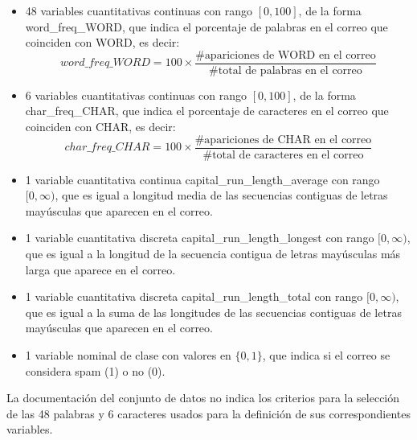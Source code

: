 \documentclass[12pt, letterpaper]{article}
\begin{document}
\begin{itemize}
	\item 48 variables cuantitativas continuas con rango $[0,100]$, de la forma word\_freq\_WORD, que indica el porcentaje de palabras en el correo que coinciden con WORD, es decir:
	$$word\_freq\_WORD = 100 \times \dfrac{\#\text{apariciones de WORD en el correo}}{\#\text{total de palabras en el correo}}$$
	
	\item 6 variables cuantitativas continuas con rango $[0,100]$, de la forma char\_freq\_CHAR, que indica el porcentaje de caracteres en el correo que coinciden con CHAR, es decir:	
		$$char\_freq\_CHAR = 100 \times \dfrac{\#\text{apariciones de CHAR en el correo}}{\#\text{total de caracteres en el correo}}$$
		
	\item 1 variable cuantitativa continua \textsf{capital\_run\_length\_average} con rango $[0,\infty)$, que es igual a longitud media de las secuencias contiguas de letras mayúsculas que aparecen en el correo.
	
	\item 1 variable cuantitativa discreta \textsf{capital\_run\_length\_longest} con rango $[0,\infty)$, que es igual a la longitud de la secuencia contigua de letras mayúsculas más larga que aparece en el correo.
	
	\item 1 variable cuantitativa discreta \textsf{capital\_run\_length\_total} con rango $[0,\infty)$, que es igual a la suma de las longitudes de las secuencias contiguas de letras mayúsculas que aparecen en el correo.
	
	\item 1 variable nominal de clase con valores en $\{0, 1\}$, que indica si el correo se considera spam (1) o no (0).
\end{itemize}

La documentación del conjunto de datos no indica los criterios para la selección de las 48 palabras y 6 caracteres usados para la definición de sus correspondientes variables.
\end{document}

